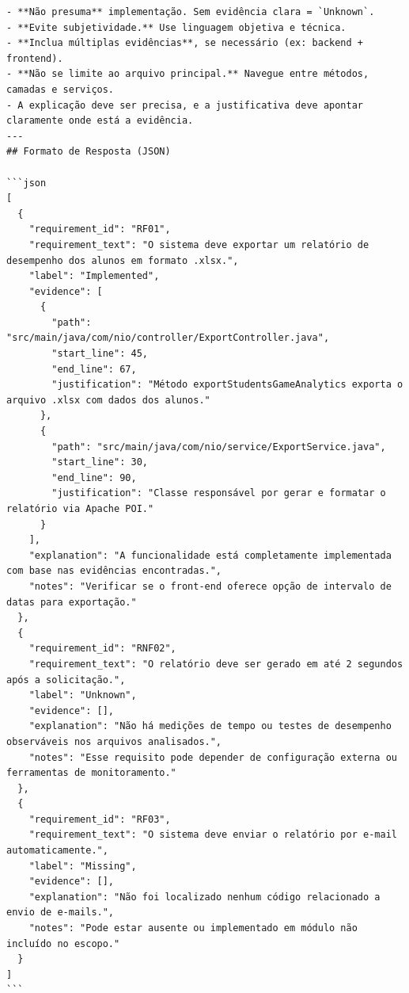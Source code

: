 \begin{verbatim}
- **Não presuma** implementação. Sem evidência clara = `Unknown`.
- **Evite subjetividade.** Use linguagem objetiva e técnica.
- **Inclua múltiplas evidências**, se necessário (ex: backend + frontend).
- **Não se limite ao arquivo principal.** Navegue entre métodos, camadas e serviços.
- A explicação deve ser precisa, e a justificativa deve apontar claramente onde está a evidência.
---
## Formato de Resposta (JSON)

```json
[
  {
    "requirement_id": "RF01",
    "requirement_text": "O sistema deve exportar um relatório de desempenho dos alunos em formato .xlsx.",
    "label": "Implemented",
    "evidence": [
      {
        "path": "src/main/java/com/nio/controller/ExportController.java",
        "start_line": 45,
        "end_line": 67,
        "justification": "Método exportStudentsGameAnalytics exporta o arquivo .xlsx com dados dos alunos."
      },
      {
        "path": "src/main/java/com/nio/service/ExportService.java",
        "start_line": 30,
        "end_line": 90,
        "justification": "Classe responsável por gerar e formatar o relatório via Apache POI."
      }
    ],
    "explanation": "A funcionalidade está completamente implementada com base nas evidências encontradas.",
    "notes": "Verificar se o front-end oferece opção de intervalo de datas para exportação."
  },
  {
    "requirement_id": "RNF02",
    "requirement_text": "O relatório deve ser gerado em até 2 segundos após a solicitação.",
    "label": "Unknown",
    "evidence": [],
    "explanation": "Não há medições de tempo ou testes de desempenho observáveis nos arquivos analisados.",
    "notes": "Esse requisito pode depender de configuração externa ou ferramentas de monitoramento."
  },
  {
    "requirement_id": "RF03",
    "requirement_text": "O sistema deve enviar o relatório por e-mail automaticamente.",
    "label": "Missing",
    "evidence": [],
    "explanation": "Não foi localizado nenhum código relacionado a envio de e-mails.",
    "notes": "Pode estar ausente ou implementado em módulo não incluído no escopo."
  }
]
```
\end{verbatim}
\label{alg:prompt-v2} 
\vspace{2em}
